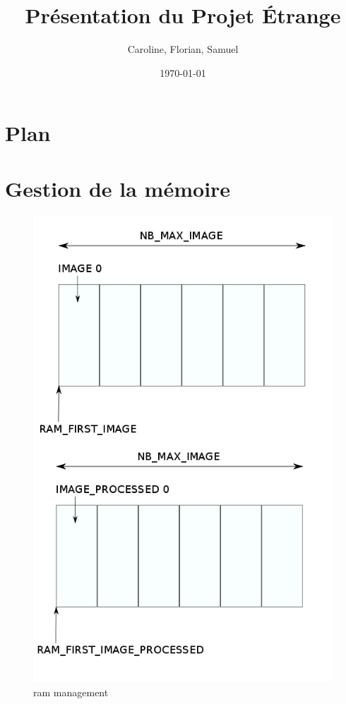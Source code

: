 \documentclass{beamer}
\title[SoC]{Présentation du Projet Étrange}
\author{Caroline, Florian, Samuel}
\institute{Télécom Paristech}
\date{\today}
\begin{document}
\begin{frame}
  \titlepage
\end{frame}



\section*{Plan}
%

\section{Gestion de la mémoire}
\begin{frame}
\begin{figure}[!h]
\centering
\includegraphics[scale = 0.23]{../rapport/ram_management.png}
\caption{ram management}
\end{figure}
\end{frame}
\end{document}
